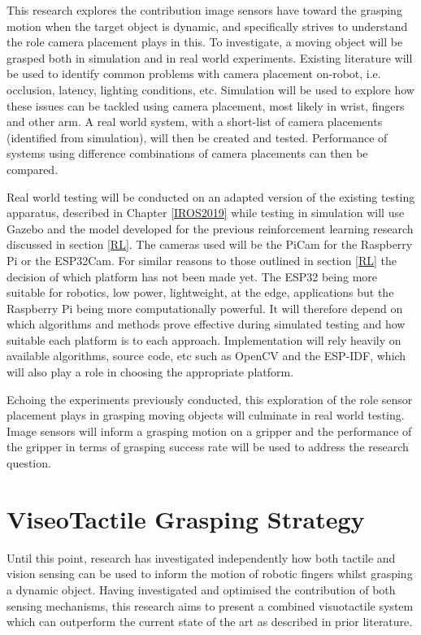 This research explores the contribution image sensors have toward the grasping motion when the target object is dynamic, and specifically strives to understand the role camera placement plays in this. To investigate, a moving object will be grasped both in simulation and in real world experiments. Existing literature will be used to identify common problems with camera placement on-robot, i.e. occlusion, latency, lighting conditions, etc. Simulation will be used to explore how these issues can be tackled using camera placement, most likely in wrist, fingers and other arm. A real world system, with a short-list of camera placements (identified from simulation), will then be created and tested. Performance of systems using difference combinations of camera placements can then be compared.

Real world testing will be conducted on an adapted version of the existing testing apparatus, described in Chapter \ref{IROS2019} while testing in simulation will use Gazebo and the model developed for the previous reinforcement learning research discussed in section \ref{RL}. The cameras used will be the PiCam for the Raspberry Pi or the ESP32Cam. For similar reasons to those outlined in section \ref{RL} the decision of which platform has not been made yet. The ESP32 being more suitable for robotics, low power, lightweight, at the edge, applications but the Raspberry Pi being more computationally powerful. It will therefore depend on which algorithms and methods prove effective during simulated testing and how suitable each platform is to each approach. Implementation will rely heavily on available algorithms, source code, etc such as OpenCV and the ESP-IDF, which will also play a role in choosing the appropriate platform.

Echoing the experiments previously conducted, this exploration of the role sensor placement plays in grasping moving objects will culminate in real world testing. Image sensors will inform a grasping motion on a gripper and the performance of the gripper in terms of grasping success rate will be used to address the research question.

\section{ViseoTactile Grasping Strategy}

Until this point, research has investigated independently how both tactile and vision sensing can be used to inform the motion of robotic fingers whilst grasping a dynamic object. Having investigated and optimised the contribution of both sensing mechanisms, this research aims to present a combined visuotactile system which can outperform the current state of the art as described in prior literature. 


